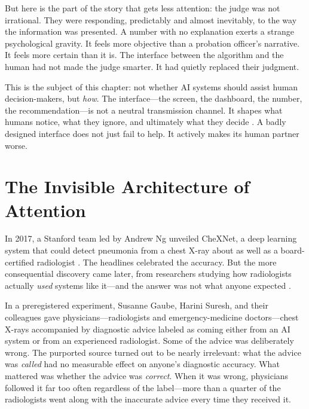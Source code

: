 But here is the part of the story that gets less attention: the judge was not irrational. They were responding, predictably and almost inevitably, to the way the information was presented. A number with no explanation exerts a strange psychological gravity. It feels more objective than a probation officer's narrative. It feels more certain than it is. The interface between the algorithm and the human had not made the judge smarter. It had quietly replaced their judgment.

This is the subject of this chapter: not whether AI systems should assist human decision-makers, but \emph{how}. The interface---the screen, the dashboard, the number, the recommendation---is not a neutral transmission channel. It shapes what humans notice, what they ignore, and ultimately what they decide \autocite{norman2013design}. A badly designed interface does not just fail to help. It actively makes its human partner worse.

\section{The Invisible Architecture of Attention}
\label{sec:ch6-attention}

In 2017, a Stanford team led by Andrew Ng unveiled CheXNet, a deep learning system that could detect pneumonia from a chest X-ray about as well as a board-certified radiologist \autocite{rajpurkar2017chexnet}. The headlines celebrated the accuracy. But the more consequential discovery came later, from researchers studying how radiologists actually \emph{used} systems like it---and the answer was not what anyone expected \autocite{gaube2021ai}.

In a preregistered experiment, Susanne Gaube, Harini Suresh, and their colleagues gave physicians---radiologists and emergency-medicine doctors---chest X-rays accompanied by diagnostic advice labeled as coming either from an AI system or from an experienced radiologist. Some of the advice was deliberately wrong. The purported source turned out to be nearly irrelevant: what the advice was \emph{called} had no measurable effect on anyone's diagnostic accuracy. What mattered was whether the advice was \emph{correct}. When it was wrong, physicians followed it far too often regardless of the label---more than a quarter of the radiologists went along with the inaccurate advice every time they received it.

